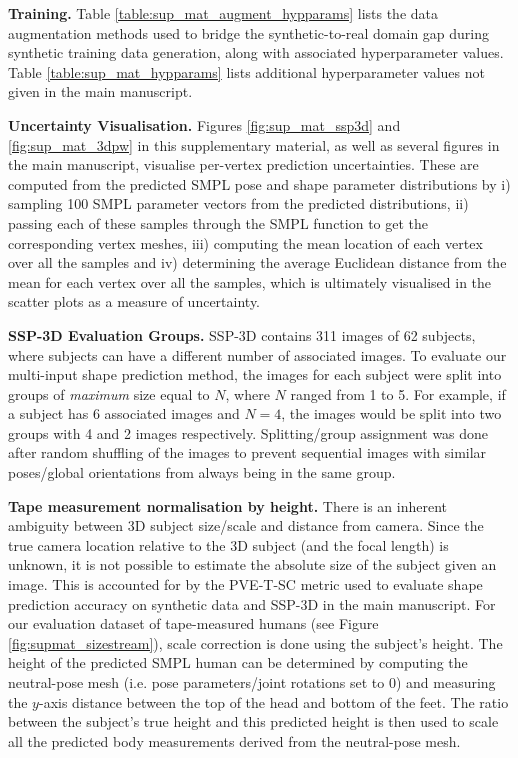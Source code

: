 \documentclass[final]{cvpr}
\begin{document}
\noindent \textbf{Training.} Table \ref{table:sup_mat_augment_hypparams} lists the data augmentation methods used to bridge the synthetic-to-real domain gap during synthetic training data generation, along with associated hyperparameter values. Table \ref{table:sup_mat_hypparams} lists additional hyperparameter values not given in the main manuscript.

\noindent \textbf{Uncertainty Visualisation.} Figures \ref{fig:sup_mat_ssp3d} and \ref{fig:sup_mat_3dpw} in this supplementary material, as well as several figures in the main manuscript, visualise per-vertex prediction uncertainties. These are computed from the predicted SMPL \cite{SMPL:2015} pose and shape parameter distributions by i) sampling 100 SMPL parameter vectors from the predicted distributions, ii) passing each of these samples through the SMPL function to get the corresponding vertex meshes, iii) computing the mean location of each vertex over all the samples and iv) determining the average Euclidean distance from the mean for each vertex over all the samples, which is ultimately visualised in the scatter plots as a measure of uncertainty.

\noindent \textbf{SSP-3D Evaluation Groups.} SSP-3D \cite{STRAPS2020BMVC} contains 311 images of 62 subjects, where subjects can have a different number of associated images. To evaluate our multi-input shape prediction method, the images for each subject were split into groups of \textit{maximum} size equal to $N$, where $N$ ranged from 1 to 5. For example, if a subject has 6 associated images and $N=4$, the images would be split into two groups with 4 and 2 images respectively. Splitting/group assignment was done after random shuffling of the images to prevent sequential images with similar poses/global orientations from always being in the same group.

\noindent \textbf{Tape measurement normalisation by height.} There is an inherent ambiguity between 3D subject size/scale and distance from camera. Since the true camera location relative to the 3D subject (and the focal length) is unknown, it is not possible to estimate the absolute size of the subject given an image. This is accounted for by the PVE-T-SC \cite{STRAPS2020BMVC} metric used to evaluate shape prediction accuracy on synthetic data and SSP-3D in the main manuscript. For our evaluation dataset of tape-measured humans (see Figure \ref{fig:supmat_sizestream}), scale correction is done using the subject's height. The height of the predicted SMPL human can be determined by computing the neutral-pose mesh (i.e. pose parameters/joint rotations set to 0) and measuring the $y$-axis distance between the top of the head and bottom of the feet. The ratio between the subject's true height and this predicted height is then used to scale all the predicted body measurements derived from the neutral-pose mesh.
\end{document}
